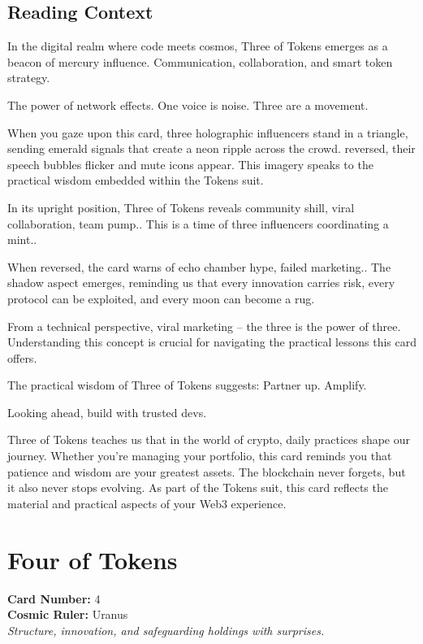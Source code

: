 \documentclass[11pt,oneside]{book}
\begin{document}
\begin{minipage}[t]{0.55\textwidth}
  \subsection*{Reading Context}
  In the digital realm where code meets cosmos, Three of Tokens emerges as a beacon of mercury influence. Communication, collaboration, and smart token strategy.

  The power of network effects. One voice is noise. Three are a movement.

  When you gaze upon this card, three holographic influencers stand in a triangle, sending emerald signals that create a neon ripple across the crowd. reversed, their speech bubbles flicker and mute icons appear. This imagery speaks to the practical wisdom embedded within the Tokens suit.

  In its upright position, Three of Tokens reveals community shill, viral collaboration, team pump.. This is a time of three influencers coordinating a mint..

  When reversed, the card warns of echo chamber hype, failed marketing.. The shadow aspect emerges, reminding us that every innovation carries risk, every protocol can be exploited, and every moon can become a rug.

  From a technical perspective, viral marketing – the three is the power of three. Understanding this concept is crucial for navigating the practical lessons this card offers.

  The practical wisdom of Three of Tokens suggests: Partner up. Amplify.

  Looking ahead, build with trusted devs.

  Three of Tokens teaches us that in the world of crypto, daily practices shape our journey. Whether you're managing your portfolio, this card reminds you that patience and wisdom are your greatest assets. The blockchain never forgets, but it also never stops evolving. As part of the Tokens suit, this card reflects the material and practical aspects of your Web3 experience.

\end{minipage}

\newpage
\section*{Four of Tokens}

\begin{minipage}[t]{0.55\textwidth}
  \vspace{0pt}
  \textbf{Card Number:} 4\\  \textbf{Cosmic Ruler:} Uranus\\  \textit{Structure, innovation, and safeguarding holdings with surprises.}
\end{minipage}
\end{document}
